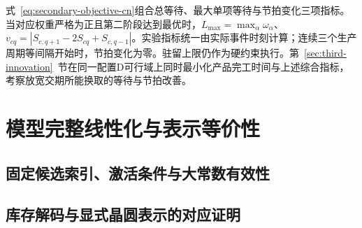 式~\eqref{eq:secondary-objective-cn}组合总等待、最大单项等待与节拍变化三项指标。当对应权重严格为正且第二阶段达到最优时，$L_{\max}=\max_\alpha\omega_\alpha$、$v_{cq}=|S_{c,q+1}-2S_{cq}+S_{c,q-1}|$。实验指标统一由实际事件时刻计算；连续三个生产周期等间隔开始时，节拍变化为零。驻留上限仍作为硬约束执行。第~\ref{sec:third-innovation}~节在同一配置D可行域上同时最小化产品完工时间与上述综合指标，考察放宽交期所能换取的等待与节拍改善。


\FloatBarrier
\section{模型完整线性化与表示等价性}
\subsection{固定候选索引、激活条件与大常数有效性}
\vspace*{3cm}
\subsection{库存解码与显式晶圆表示的对应证明}
\vspace*{3cm}
